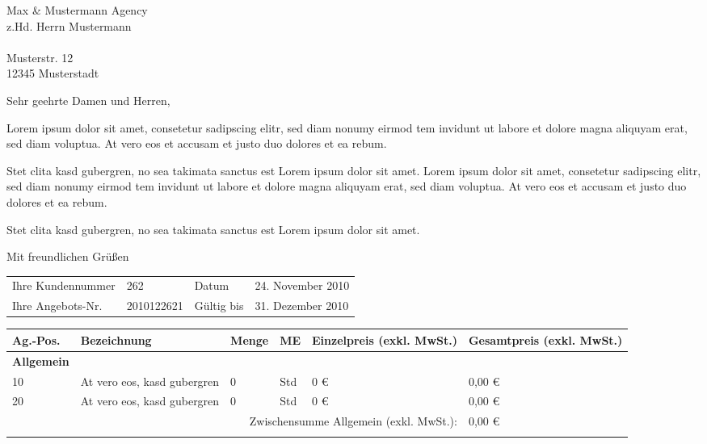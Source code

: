 \documentclass[DIN, pagenumber=footmiddle, parskip=half,
	fromalign=right,  %
	fromphone=true, fromfax=false,
	fromrule=false]{scrlttr2}
\begin{document}
\begin{letter}{
	Max \& Mustermann Agency\\ 
	z.Hd. Herrn Mustermann\\ \ \\
	Musterstr. 12\\
	12345 Musterstadt
}

\opening{Sehr geehrte Damen und Herren,}
Lorem ipsum dolor sit amet, consetetur sadipscing elitr, sed diam nonumy eirmod tem 
invidunt ut labore et dolore magna aliquyam erat, sed diam voluptua. At vero eos et accusam 
et justo duo dolores et ea rebum. 

Stet clita kasd gubergren, no sea takimata sanctus est Lorem ipsum dolor sit amet. Lorem 
ipsum dolor sit amet, consetetur sadipscing elitr, sed diam nonumy eirmod tem invidunt ut 
labore et dolore magna aliquyam erat, sed diam voluptua. At vero eos et accusam et justo duo 
dolores et ea rebum. 

Stet clita kasd gubergren, no sea takimata sanctus est Lorem ipsum dolor sit amet.\\ 

\closing{Mit freundlichen Grüßen}


\newpage


\begin{longtable}{p{4cm}p{6.5cm}p{2cm}p{4cm}}
	Ihre Kundennummer	& 262 & Datum & 24. November 2010\\
	Ihre Angebots-Nr. & 2010122621 & Gültig bis & 31. Dezember 2010\\
\end{longtable}


\begin{longtable}{p{2.5cm}p{5.5cm}p{1cm}p{1cm}p{2.5cm}p{2.5cm}}
	\hline 	
	Ag.-Pos. & Bezeichnung & Menge & ME & Einzelpreis (exkl. MwSt.) & Gesamtpreis (exkl. MwSt.)\\
	\hline 
	
	\textbf{Allgemein}\\
	10 & At vero eos, kasd gubergren & 0 & Std & 0 \euro{} & 0,00 \euro{}\\
	20 & At vero eos, kasd gubergren  & 0 & Std & 0 \euro{} & 0,00 \euro{}\\
	\multicolumn{5}{r}{Zwischensumme Allgemein (exkl. MwSt.):} & 0,00 \euro{}\\
	\\
	

\end{longtable}
\end{letter}
\end{document}
